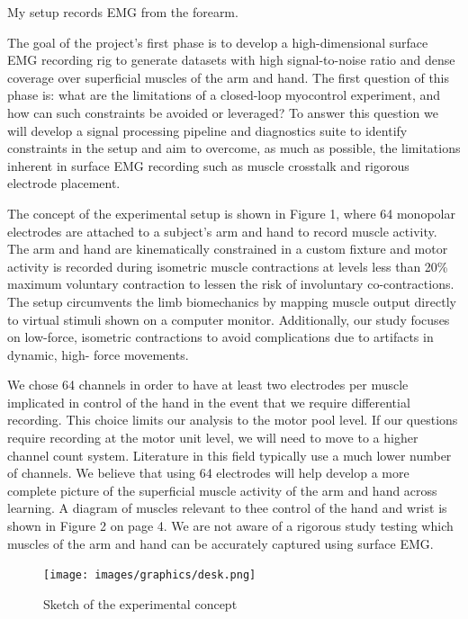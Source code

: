\documentclass[
  a4paper,
]{article}
\makeatletter
\newcounter{figno}
\newenvironment{fignos:no-prefix-figure-caption}{
  \caption@ifcompatibility{}{
    \let\oldthefigure\thefigure
    \let\oldtheHfigure\theHfigure
    \renewcommand{\thefigure}{figno:\thefigno}
    \renewcommand{\theHfigure}{figno:\thefigno}
    \stepcounter{figno}
    \captionsetup{labelformat=empty}
  }
}{
  \caption@ifcompatibility{}{
    \captionsetup{labelformat=default}
    \let\thefigure\oldthefigure
    \let\theHfigure\oldtheHfigure
    \addtocounter{figure}{-1}
  }
}
\makeatother
\begin{document}
My setup records EMG from the forearm.

The goal of the project's first phase is to develop a high-dimensional
surface EMG recording rig to generate datasets with high signal-to-noise
ratio and dense coverage over superficial muscles of the arm and hand.
The first question of this phase is: what are the limitations of a
closed-loop myocontrol experiment, and how can such constraints be
avoided or leveraged? To answer this question we will develop a signal
processing pipeline and diagnostics suite to identify constraints in the
setup and aim to overcome, as much as possible, the limitations inherent
in surface EMG recording such as muscle crosstalk and rigorous electrode
placement.

The concept of the experimental setup is shown in Figure 1, where 64
monopolar electrodes are attached to a subject's arm and hand to record
muscle activity. The arm and hand are kinematically constrained in a
custom fixture and motor activity is recorded during isometric muscle
contractions at levels less than 20\% maximum voluntary contraction to
lessen the risk of involuntary co-contractions. The setup circumvents
the limb biomechanics by mapping muscle output directly to virtual
stimuli shown on a computer monitor. Additionally, our study focuses on
low-force, isometric contractions to avoid complications due to
artifacts in dynamic, high- force movements.

We chose 64 channels in order to have at least two electrodes per muscle
implicated in control of the hand in the event that we require
differential recording. This choice limits our analysis to the motor
pool level. If our questions require recording at the motor unit level,
we will need to move to a higher channel count system. Literature in
this field typically use a much lower number of channels. We believe
that using 64 electrodes will help develop a more complete picture of
the superficial muscle activity of the arm and hand across learning. A
diagram of muscles relevant to thee control of the hand and wrist is
shown in Figure 2 on page 4. We are not aware of a rigorous study
testing which muscles of the arm and hand can be accurately captured
using surface EMG.

\begin{fignos:no-prefix-figure-caption}

\begin{figure}
\centering
\texttt{[image: images/graphics/desk.png]}
\caption{Sketch of the experimental concept}
\end{figure}

\end{fignos:no-prefix-figure-caption}
\end{document}

